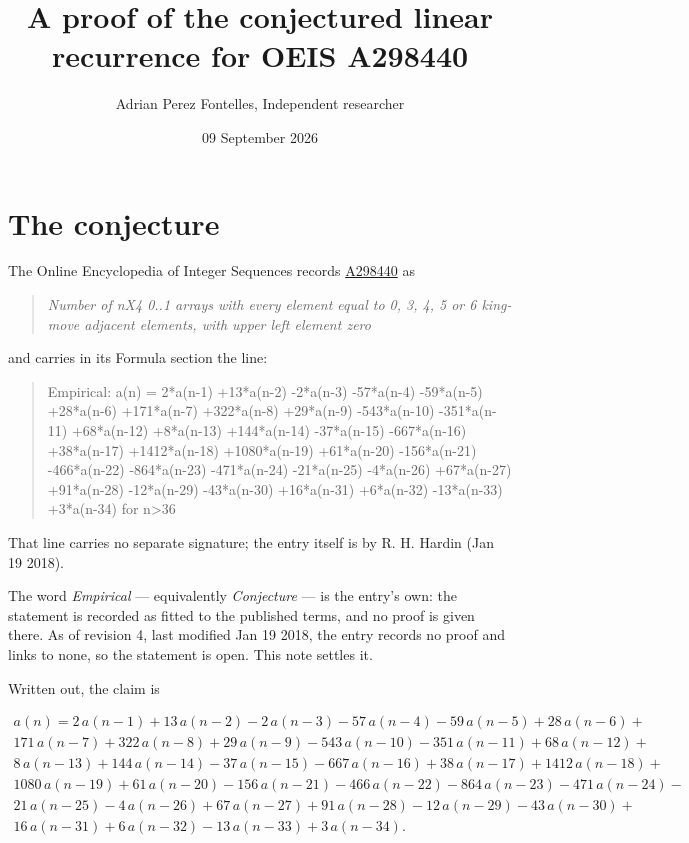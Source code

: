 \documentclass[11pt]{article}
\title{A proof of the conjectured linear recurrence for OEIS A298440}
\author{Adrian Perez Fontelles, Independent researcher}
\date{09 September 2026}
\theoremstyle{definition}
\begin{document}
\maketitle
\section{The conjecture}

The Online Encyclopedia of Integer Sequences records \href{https://oeis.org/A298440}{A298440} as

\begin{quote}\itshape Number of nX4 0..1 arrays with every element equal to 0, 3, 4, 5 or 6 king-move adjacent elements, with upper left element zero\end{quote}

and carries in its Formula section the line:

\begin{quote}\ttfamily Empirical: a(n) = 2*a(n-1) +13*a(n-2) -2*a(n-3) -57*a(n-4) -59*a(n-5) +28*a(n-6) +171*a(n-7) +322*a(n-8) +29*a(n-9) -543*a(n-10) -351*a(n-11) +68*a(n-12) +8*a(n-13) +144*a(n-14) -37*a(n-15) -667*a(n-16) +38*a(n-17) +1412*a(n-18) +1080*a(n-19) +61*a(n-20) -156*a(n-21) -466*a(n-22) -864*a(n-23) -471*a(n-24) -21*a(n-25) -4*a(n-26) +67*a(n-27) +91*a(n-28) -12*a(n-29) -43*a(n-30) +16*a(n-31) +6*a(n-32) -13*a(n-33) +3*a(n-34) for n>36\end{quote}

That line carries no separate signature; the entry itself is by R. H. Hardin (Jan 19 2018).

The word {\itshape Empirical} --- equivalently {\itshape Conjecture} --- is the entry's own: the statement is recorded as fitted to the published terms, and no proof is given there. As of revision 4, last modified Jan 19 2018, the entry records no proof and links to none, so the statement is open. This note settles it.

Written out, the claim is

\begin{multline*} a(n) = 2\,a(n-1) + 13\,a(n-2) - 2\,a(n-3) - 57\,a(n-4) - 59\,a(n-5) + 28\,a(n-6) + \\ 171\,a(n-7) + 322\,a(n-8) + 29\,a(n-9) - 543\,a(n-10) - 351\,a(n-11) + 68\,a(n-12) + \\ 8\,a(n-13) + 144\,a(n-14) - 37\,a(n-15) - 667\,a(n-16) + 38\,a(n-17) + 1412\,a(n-18) + \\ 1080\,a(n-19) + 61\,a(n-20) - 156\,a(n-21) - 466\,a(n-22) - 864\,a(n-23) - 471\,a(n-24) - \\ 21\,a(n-25) - 4\,a(n-26) + 67\,a(n-27) + 91\,a(n-28) - 12\,a(n-29) - 43\,a(n-30) + \\ 16\,a(n-31) + 6\,a(n-32) - 13\,a(n-33) + 3\,a(n-34). \end{multline*}
\end{document}
